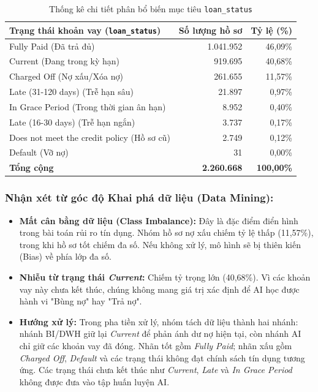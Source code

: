 \begin{table}[H]
    \centering
    \renewcommand{\arraystretch}{1.2}
    \begin{tabular}{|l|r|r|}
        \hline
        \textbf{Trạng thái khoản vay (\texttt{loan\_status})} & \textbf{Số lượng hồ sơ} & \textbf{Tỷ lệ (\%)} \\ \hline
        Fully Paid (Đã trả đủ) & 1.041.952 & 46,09\% \\ \hline
        Current (Đang trong kỳ hạn) & 919.695 & 40,68\% \\ \hline
        Charged Off (Nợ xấu/Xóa nợ) & 261.655 & 11,57\% \\ \hline
        Late (31-120 days) (Trễ hạn sâu) & 21.897 & 0,97\% \\ \hline
        In Grace Period (Trong thời gian ân hạn) & 8.952 & 0,40\% \\ \hline
        Late (16-30 days) (Trễ hạn ngắn) & 3.737 & 0,17\% \\ \hline
        Does not meet the credit policy (Hồ sơ cũ) & 2.749 & 0,12\% \\ \hline
        Default (Vỡ nợ) & 31 & 0,00\% \\ \hline
        \rowcolor[HTML]{EFEFEF} 
        \textbf{Tổng cộng} & \textbf{2.260.668} & \textbf{100,00\%} \\ \hline
    \end{tabular}
    \caption{Thống kê chi tiết phân bổ biến mục tiêu \texttt{loan\_status}}
    \label{tab:loan_status_dist}
\end{table}

\subsubsection{Nhận xét từ góc độ Khai phá dữ liệu (Data Mining):} 
\begin{itemize}
    \item \textbf{Mất cân bằng dữ liệu (Class Imbalance):} Đây là đặc điểm điển hình trong bài toán rủi ro tín dụng. Nhóm hồ sơ nợ xấu chiếm tỷ lệ thấp (11,57\%), trong khi hồ sơ tốt chiếm đa số. Nếu không xử lý, mô hình sẽ bị thiên kiến (Bias) về phía lớp đa số.
    \item \textbf{Nhiễu từ trạng thái \textit{Current}:} Chiếm tỷ trọng lớn (40,68\%). Vì các khoản vay này chưa kết thúc, chúng không mang giá trị xác định để AI học được hành vi "Bùng nợ" hay "Trả nợ".
    \item \textbf{Hướng xử lý:} Trong pha tiền xử lý, nhóm tách dữ liệu thành hai nhánh: nhánh BI/DWH giữ lại \textit{Current} để phản ánh dư nợ hiện tại, còn nhánh AI chỉ giữ các khoản vay đã đóng. Nhãn tốt gồm \textit{Fully Paid}; nhãn xấu gồm \textit{Charged Off}, \textit{Default} và các trạng thái không đạt chính sách tín dụng tương ứng. Các trạng thái chưa kết thúc như \textit{Current}, \textit{Late} và \textit{In Grace Period} không được đưa vào tập huấn luyện AI.
\end{itemize}

